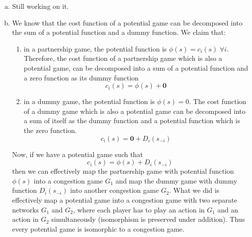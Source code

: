\documentclass[a4paper,12pt]{article}
\theoremstyle{definition}
\begin{document}
\begin{enumerate}
\begin{enumerate}[(a)]
\item 
Still working on it.
\item We know that the cost function of a potential game can be decomposed into the sum of a potential function and a dummy function. We claim that:
\begin{enumerate}
\item in a partnership game, the potential function is $\phi(s)=c_i(s) \; \forall i$. Therefore, the cost function of a partnership game which is also a potential game, can be decomposed into a sum of a potential function and a zero function as its dummy function 
\[ c_i(s) = \phi(s) + \mathbf{0}\]
\item in a dummy game, the potential function is $\phi(s) = 0$. The cost function of a dummy game which is also a potential game can be decomposed into a sum of itself as the dummy function and a potential function which is the zero function.
\[ c_i(s) = \mathbf{0} + D_i(s_{-i})\]
\end{enumerate}
Now, if we have a potential game such that
\[ c_i(s) = \phi(s) + D_i(s_{-i})\]
then we can effectively map the partnership game with potential function $\phi(s)$ into a congestion game $G_1$ and map the dummy game with dummy function $D_i(s_{-i})$ into another congestion game $G_2$. What we did is effectively map a potential game into a congestion game with two separate networks $G_1$ and $G_2$, where each player has to play an action in $G_1$ and an action in $G_2$ simultaneously (isomorphism is preserved under addition). Thus every potential game is isomorphic to a congestion game.


%
%

\end{enumerate}



\end{enumerate}
\end{document}
